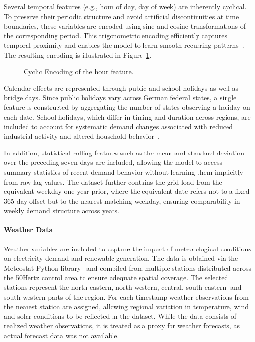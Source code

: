 Several temporal features (e.g., hour of day, day of week) are inherently cyclical. To preserve their periodic structure and avoid artificial discontinuities at time boundaries, these variables are encoded using sine and cosine transformations of the corresponding period. This trigonometric encoding efficiently captures temporal proximity and enables the model to learn smooth recurring patterns~\cite{rodrigo_2025_skforecast, pedregosa_2011_scikit}. The resulting encoding is illustrated in Figure~\ref{fig:cyclic_encoding}.
\begin{figure}[ht]
    \centering
    
    \caption{Cyclic Encoding of the hour feature.}
    \label{fig:cyclic_encoding}
\end{figure}

Calendar effects are represented through public and school holidays as well as bridge days. Since public holidays vary across German federal states, a single feature is constructed by aggregating the number of states observing a holiday on each date. School holidays, which differ in timing and duration across regions, are included to account for systematic demand changes associated with reduced industrial activity and altered household behavior~\cite{johannsen_2025_schulferien}.

In addition, statistical rolling features such as the mean and standard deviation over the preceding seven days are included, allowing the model to access summary statistics of recent demand behavior without learning them implicitly from raw lag values. The dataset further contains the grid load from the equivalent weekday one year prior, where the equivalent date refers not to a fixed 365-day offset but to the nearest matching weekday, ensuring comparability in weekly demand structure across years. 

\paragraph*{Weather Data}
Weather variables are included to capture the impact of meteorological conditions on electricity demand and renewable generation. The data is obtained via the Meteostat Python library~\cite{lamprecht_2025_meteostat} and compiled from multiple stations distributed across the 50Hertz control area to ensure adequate spatial coverage. The selected stations represent the north-eastern, north-western, central, south-eastern, and south-western parts of the region. For each timestamp weather observations from the nearest station are assigned, allowing regional variation in temperature, wind and solar conditions to be reflected in the dataset. While the data consists of realized weather observations, it is treated as a proxy for weather forecasts, as actual forecast data was not available.

